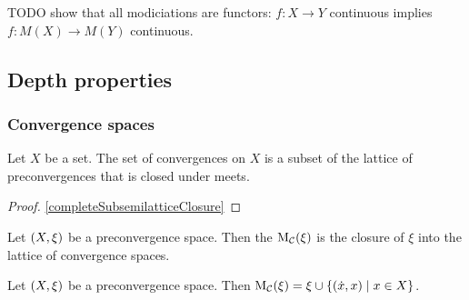 TODO show that all modiciations are functors: $f:X\to Y$ continuous implies $f: M(X)\to M(Y)$ continuous.


\subsection{Depth properties}
\subsubsection{Convergence spaces}
\begin{lemma}
Let $X$ be a set. The set of convergences on $X$ is a subset of the lattice of preconvergences that is closed under meets.
\end{lemma}
\begin{proof}
\ref{completeSubsemilatticeClosure}
\end{proof}

\begin{definition}
Let $\left( X,\xi \right)$ be a preconvergence space. Then the  $\operatorname{M_\mathcal{C}}(\xi)$ is the closure of $\xi$ into the lattice of convergence spaces.
\end{definition}

\begin{lemma} \label{convModConstruction}
Let $\left( X,\xi \right)$ be a preconvergence space. Then $\convMod(\xi) = \xi \cup \setbuilder{(\pfilter{x}, x)}{x\in X}$.
\end{lemma}

